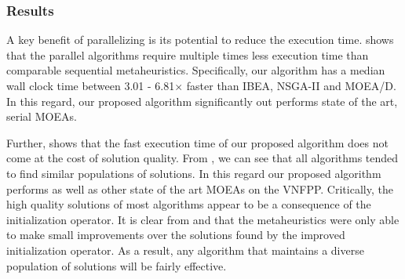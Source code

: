 

\subsubsection{Results}
A key benefit of parallelizing is its potential to reduce the execution time.  shows that the parallel algorithms require multiple times less execution time than comparable sequential metaheuristics. Specifically, our algorithm has a median wall clock time between 3.01 - 6.81$\times$ faster than IBEA, NSGA-II and MOEA/D. In this regard, our proposed algorithm significantly out performs state of the art, serial MOEAs.

Further,  shows that the fast execution time of our proposed algorithm does not come at the cost of solution quality. From , we can see that all algorithms tended to find similar populations of solutions. In this regard our proposed algorithm performs as well as other state of the art MOEAs on the VNFPP. Critically, the high quality solutions of most algorithms appear to be a consequence of the initialization operator. It is clear from  and  that the metaheuristics were only able to make small improvements over the solutions found by the improved initialization operator. As a result, any algorithm that maintains a diverse population of solutions will be fairly effective.

